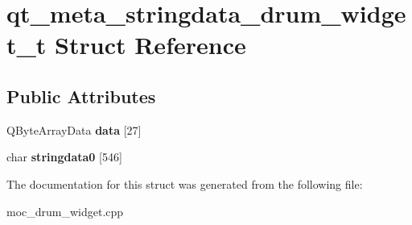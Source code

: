 \hypertarget{structqt__meta__stringdata__drum__widget__t}{}\section{qt\+\_\+meta\+\_\+stringdata\+\_\+drum\+\_\+widget\+\_\+t Struct Reference}
\label{structqt__meta__stringdata__drum__widget__t}
\subsection*{Public Attributes}
\begin{DoxyCompactItemize}
\item 
\mbox{\label{structqt__meta__stringdata__drum__widget__t_a6e6ebc2203932e9d0705832bc84edc8b}} 
Q\+Byte\+Array\+Data {\bfseries data} \mbox{[}27\mbox{]}
\item 
\mbox{\label{structqt__meta__stringdata__drum__widget__t_a02e7f91ccb5166c16e029ac98f751676}} 
char {\bfseries stringdata0} \mbox{[}546\mbox{]}
\end{DoxyCompactItemize}


The documentation for this struct was generated from the following file\+:\begin{DoxyCompactItemize}
\item 
moc\+\_\+drum\+\_\+widget.\+cpp\end{DoxyCompactItemize}
